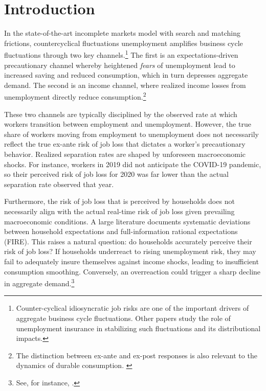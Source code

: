 
\section{Introduction}
In the state-of-the-art incomplete markets model with search and matching frictions, countercyclical fluctuations unemployment amplifies business cycle fluctuations through two key channels.\footnote{Counter-cyclical idiosyncratic job risks are one of the important drivers of aggregate business cycle fluctuations\citep{bayer2019precautionary,den2018unemployment,broer2021unemployment, graves2020does}. Other papers study the role of unemployment insurance in stabilizing such fluctuations and its distributional impacts\citep{mckay2021optimal,boone2021unemployment,kekre2023unemployment}.} The first is an expectations-driven precautionary channel whereby heightened \textit{fears} of unemployment lead to increased saving and reduced consumption, which in turn depresses aggregate demand. The second is an income channel, where realized income losses from unemployment directly reduce consumption.\footnote{The distinction between ex-ante and ex-post responses is also relevant to the dynamics of durable consumption. \citep{harmenberg2021consumption}}





These two channels are typically disciplined by the observed rate at which workers transition between employment and unemployment. However, the true share of workers moving from employment to unemployment does not necessarily reflect the true ex-ante risk of job loss that dictates a worker's precautionary behavior. Realized separation rates are shaped by unforeseen macroeconomic shocks. For instance, workers in 2019 did not anticipate the COVID-19 pandemic, so their perceived risk of job loss for 2020 was far lower than the actual separation rate observed that year. %

Furthermore, the risk of job loss that is perceived by households does not necessarily align with the actual real-time risk of job loss given prevailing macroeconomic conditions. A large literature documents systematic deviations between household expectations and full-information rational expectations (FIRE). This raises a natural question: do households accurately perceive their risk of job loss? If households underreact to rising unemployment risk, they may fail to adequately insure themselves against income shocks, leading to insufficient consumption smoothing. Conversely, an overreaction could trigger a sharp decline in aggregate demand.\footnote{See, for instance, \cite{den2018unemployment}.}



